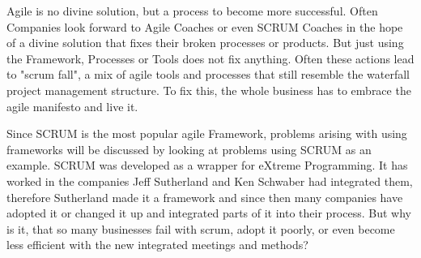Agile is no divine solution, but a process to become more successful. Often Companies look forward to Agile Coaches or even SCRUM Coaches in the hope of a divine solution that fixes their broken processes or products. But just using the Framework, Processes or Tools does not fix anything. Often these actions lead to "scrum fall", a mix of agile tools and processes that still resemble the waterfall project management structure. To fix this, the whole business has to embrace the agile manifesto and live it.

Since SCRUM is the most popular agile Framework, problems arising with using frameworks will be discussed by looking at problems using SCRUM as an example. SCRUM was developed as a wrapper for eXtreme Programming. It has worked in the companies Jeff Sutherland and Ken Schwaber had integrated them, therefore Sutherland made it a framework and since then many companies have adopted it or changed it up and integrated parts of it into their process. But why is it, that so many businesses fail with scrum, adopt it poorly, or even become less efficient with the new integrated meetings and methods?